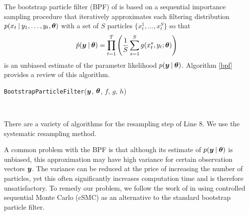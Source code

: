 \documentclass[twoside]{article}
\begin{document}
The bootstrap particle filter (BPF) of \cite{doucet2001introduction} is based on a sequential importance sampling procedure that iteratively approximates each filtering distribution $p(x_t \:\vert\: y_1, \ldots, y_t, \boldsymbol{\theta})$ with a set of $S$ particles $\{x_t^1, \ldots, x_t^S\}$ so that
\begin{align*}
\hat{p}(\boldsymbol{y} \:\vert\: \boldsymbol{\theta}) = \prod_{t=1}^T \left(\frac{1}{S}\sum_{s=1}^S g(x_t^s, y_t; \boldsymbol{\theta})\right)
\end{align*}  
is an unbiased estimate of the parameter likelihood $p(\boldsymbol{y} \:\vert\: \boldsymbol{\theta})$.  Algorithm \ref{bpf} provides a review of this algorithm.



\begin{algorithm}
\caption{\texttt{BootstrapParticleFilter}($\boldsymbol{y}$, $\boldsymbol{\theta}$, $f$, $g$, $h$)} \label{bpf}
  \begin{algorithmic}[1]
    \EndFor
   	 \EndFor
    \EndFor \\
   \end{algorithmic}
\end{algorithm}

There are a variety of algorithms for the resampling step of Line 8.  We use the systematic resampling method.

\noindent A common problem with the BPF is that although its estimate of $p(\boldsymbol{y} \:\vert\: \boldsymbol{\theta})$ is unbiased, this approximation may have high variance for certain observation vectors $\boldsymbol{y}$.  The variance can be reduced at the price of increasing the number of particles, yet this often significantly increases computation time and is therefore unsatisfactory.  To remedy our problem, we follow the work of \cite{heng2017controlled} in using controlled sequential Monte Carlo (cSMC) as an alternative to the standard bootstrap particle filter. 
\end{document}
